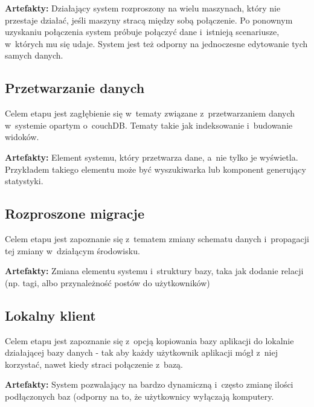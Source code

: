 \documentclass[a4paper]{article}
\begin{document}
\textbf{Artefakty:} Działający system rozproszony na wielu maszynach, który nie przestaje działać, jeśli maszyny stracą między sobą połączenie. Po ponownym uzyskaniu połączenia system próbuje połączyć dane i~istnieją scenariusze, w~których mu się udaje. System jest też odporny na jednoczesne edytowanie tych samych danych. 

\subsection{Przetwarzanie danych}
Celem etapu jest zagłębienie się w~tematy związane z~przetwarzaniem danych w~systemie opartym o~couchDB. Tematy takie jak indeksowanie i~budowanie widoków.

\textbf{Artefakty:} Element systemu, który przetwarza dane, a~nie tylko je wyświetla. Przykładem takiego elementu może być wyszukiwarka lub komponent generujący statystyki.

\subsection{Rozproszone migracje}
Celem etapu jest zapoznanie się z~tematem zmiany schematu danych i~propagacji tej zmiany w~działącym środowisku.

\textbf{Artefakty:} Zmiana elementu systemu i~struktury bazy, taka jak dodanie relacji (np. tagi, albo przynależność postów do użytkowników)

\subsection{Lokalny klient}
Celem etapu jest zapoznanie się z~opcją kopiowania bazy aplikacji do lokalnie działającej bazy danych - tak aby każdy użytkownik aplikacji mógł z~niej korzystać, nawet kiedy straci połączenie z~bazą.

\textbf{Artefakty:} System pozwalający na bardzo dynamiczną i~często zmianę ilości podłączonych baz (odporny na to, że użytkownicy wyłączają komputery. 
\end{document}

